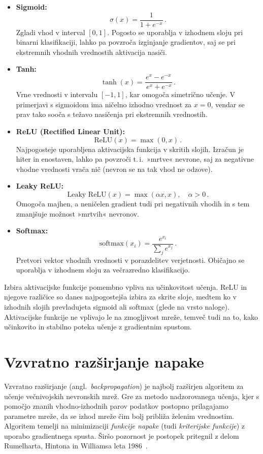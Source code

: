 \begin{itemize}
  \item \textbf{Sigmoid:}
  \[
    \sigma(x) = \frac{1}{1 + e^{-x}}\,.
  \]
  Zgladi vhod v interval $[0, 1]$. Pogosto se uporablja v izhodnem sloju pri binarni klasifikaciji, lahko pa povzroča izginjanje gradientov, saj se pri ekstremnih vhodnih vrednostih aktivacija nasiči.
  \item \textbf{Tanh:}
  \[
    \tanh(x) = \frac{e^x - e^{-x}}{\,e^x + e^{-x}}\,.
  \]
  Vrne vrednosti v intervalu $[-1, 1]$, kar omogoča simetrično učenje. V primerjavi s sigmoidom ima ničelno izhodno vrednost za $x=0$, vendar se prav tako sooča s težavo nasičenja pri ekstremnih vrednostih.
  \item \textbf{ReLU (Rectified Linear Unit):}
  \[
    \text{ReLU}(x) = \max(0, x)\,. 
  \]
  Najpogosteje uporabljena aktivacijska funkcija v skritih slojih. Izračun je hiter in enostaven, lahko pa povzroči t.\,i.\ »mrtve« nevrone, saj za negativne vhodne vrednosti vrača nič (nevron se na tak vhod ne odzove).
  \item \textbf{Leaky ReLU:}
  \[
    \text{Leaky ReLU}(x) = \max(\alpha x, x), \quad \alpha > 0\,.
  \]
  Omogoča majhen, a neničelen gradient tudi pri negativnih vhodih in s tem zmanjšuje možnost »mrtvih« nevronov.
  \item \textbf{Softmax:}
  \[
    \text{softmax}(x_i) = \frac{e^{x_i}}{\sum_j e^{x_j}}\,. 
  \]
  Pretvori vektor vhodnih vrednosti v porazdelitev verjetnosti. Običajno se uporablja v izhodnem sloju za večrazredno klasifikacijo.
\end{itemize}

Izbira aktivacijske funkcije pomembno vpliva na učinkovitost učenja. ReLU in njegove različice so danes najpogostejša izbira za skrite sloje, medtem ko v izhodnih slojih prevladujeta sigmoid ali softmax (glede na vrsto naloge). Aktivacijske funkcije ne vplivajo le na zmogljivost mreže, temveč tudi na to, kako učinkovito in stabilno poteka učenje z gradientnim spustom.


\section{Vzvratno razširjanje napake}

Vzvratno razširjanje (angl.~\textit{backpropagation}) je najbolj razširjen algoritem za učenje večnivojskih nevronskih mrež. Gre za metodo nadzorovanega učenja, kjer s pomočjo znanih vhodno-izhodnih parov podatkov postopno prilagajamo parametre mreže, da se izhod mreže čim bolj približa želenim vrednostim. Algoritem temelji na minimizaciji \textit{funkcije napake} (tudi \textit{kriterijske funkcije}) z uporabo gradientnega spusta. Širšo pozornost je postopek pritegnil z delom Rumelharta, Hintona in Williamsa leta 1986~\cite{Rumelhart1986}.

